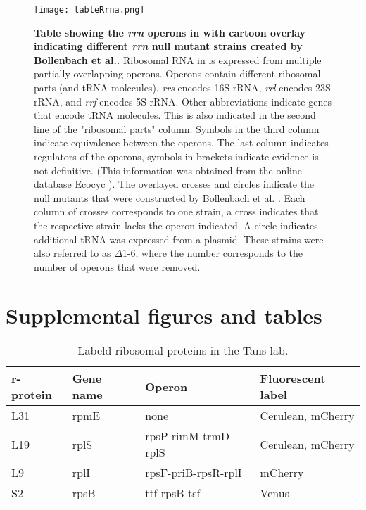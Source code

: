 \begin{figure}
    \centering
    \texttt{[image: tableRrna.png]}
    \caption{ 
        \textbf{Table showing the \textit{rrn} operons in \ecoli with cartoon overlay indicating different \textit{rrn} null mutant strains created by Bollenbach et al..}
        Ribosomal RNA in \ecoli is expressed from multiple partially overlapping operons. 
        Operons contain different ribosomal parts (and tRNA molecules). 
        \textit{rrs} encodes 16S rRNA, \textit{rrl} encodes 23S rRNA, and \textit{rrf} encodes 5S rRNA.
        Other abbreviations indicate genes that encode tRNA molecules.
        This is also indicated in the second line of the "ribosomal parts" column. 
        Symbols in the third column indicate equivalence between the operons.
        The last column indicates regulators of the operons, symbols in brackets indicate evidence is not definitive.
        (This information was obtained from the online database Ecocyc \cite{Keseler2017}).
        The overlayed crosses and circles indicate the null mutants that were constructed by Bollenbach et al. \cite{Bollenbach2009}.
        Each column of crosses corresponds to one strain, a cross indicates that the respective strain lacks the operon indicated. A circle indicates additional tRNA was expressed from a plasmid.
        These strains were also referred to as $\Delta$1-6, where the number corresponds to the number of operons that were removed.
    }
    \label{fig:ribo:tabledeltarrn}
\end{figure}


\FloatBarrier
\clearpage

\section{Supplemental figures and tables}
\FloatBarrier

\begin{table}
    \begin{tabular}{ l l l l }
        \centering
        r-protein & Gene name & Operon & Fluorescent label \\ 
        \hline
        L31 & rpmE & none & Cerulean, mCherry \\ 
        L19 & rplS & rpsP-rimM-trmD-rplS & Cerulean, mCherry \\ 
        L9 & rplI & rpsF-priB-rpsR-rplI & mCherry \\ 
        S2 & rpsB & ttf-rpsB-tsf & Venus\\ 
    \end{tabular}
    \caption{Labeld ribosomal proteins in the Tans lab. 
    } \label{tab:ribolabeledprots}
\end{table}

